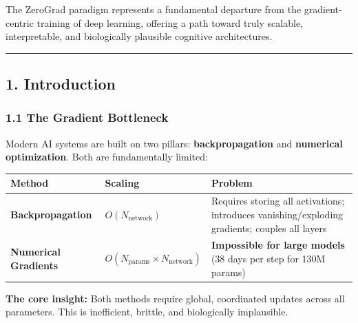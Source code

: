 \documentclass[
  11pt,
  a4paper,
]{article}
\begin{document}
The ZeroGrad paradigm represents a fundamental departure from the
gradient-centric training of deep learning, offering a path toward truly
scalable, interpretable, and biologically plausible cognitive
architectures.

\begin{center}\rule{0.5\linewidth}{0.5pt}\end{center}

\subsection{1. Introduction}\label{introduction}

\subsubsection{1.1 The Gradient
Bottleneck}\label{the-gradient-bottleneck}

Modern AI systems are built on two pillars: \textbf{backpropagation} and
\textbf{numerical optimization}. Both are fundamentally limited:

\begin{longtable}[]{@{}
  >{\raggedright\arraybackslash}p{}
  >{\raggedright\arraybackslash}p{}
  >{\raggedright\arraybackslash}p{}@{}}
\toprule\noalign{}
\begin{minipage}[b]{\linewidth}\raggedright
Method
\end{minipage} & \begin{minipage}[b]{\linewidth}\raggedright
Scaling
\end{minipage} & \begin{minipage}[b]{\linewidth}\raggedright
Problem
\end{minipage} \\
\midrule\noalign{}
\endhead
\bottomrule\noalign{}
\endlastfoot
\textbf{Backpropagation} & \(O(N_{\text{network}})\) & Requires storing
all activations; introduces vanishing/exploding gradients; couples all
layers \\
\textbf{Numerical Gradients} &
\(O(N_{\text{params}} \times N_{\text{network}})\) & \textbf{Impossible
for large models} (38 days per step for 130M params) \\
\end{longtable}

\textbf{The core insight:} Both methods require global, coordinated
updates across all parameters. This is inefficient, brittle, and
biologically implausible.
\end{document}
